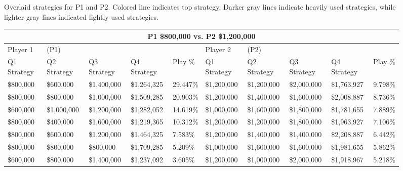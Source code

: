 \documentclass[11pt]{article}
\begin{document}
\begin{figure}
{
}
\caption{Overlaid strategies for P1 and P2. Colored line indicates top strategy. Darker gray lines indicate heavily used strategies, while lighter gray lines indicated lightly used strategies.}
\label{8v11.4}
\end{figure}

\begin{figure}
\tiny
\begin{tabular}{ |p{1.0cm}p{1.0cm}p{1.0cm}p{2.0cm}|p{1.0cm}||p{1.0cm}p{1.0cm}p{1.0cm}p{2.0cm}|p{1.0cm}|}
\hline
\multicolumn{10}{|c|}{P1 \$800,000 vs. P2 \$1,200,000} \\
\hline
Player 1 & (P1) & & & & Player 2 & (P2) & & & \\
\hline
Q1 Strategy & Q2 Strategy & Q3 Strategy & Q4 Strategy  &  Play \% & Q1 Strategy & Q2 Strategy & Q3 Strategy & Q4 Strategy  &  Play \%\\
\hline
\$800,000 & \$600,000 & \$1,400,000 & \$1,264,325 & 29.447\% & \$1,200,000 & \$1,200,000 & \$2,000,000 & \$1,763,927 & 9.798\% \\
\$800,000 & \$800,000 & \$1,000,000 & \$1,509,285 & 20.903\% & \$1,200,000 & \$1,400,000 & \$1,600,000 & \$2,008,887 & 8.736\% \\
\$600,000 & \$1,000,000 & \$1,200,000 & \$1,282,052 & 14.619\% & \$1,000,000 & \$1,600,000 & \$1,800,000 & \$1,781,655 & 7.889\% \\
\$800,000 & \$400,000 & \$1,600,000 & \$1,219,365 & 10.312\% & \$1,200,000 & \$1,200,000 & \$1,800,000 & \$1,963,927 & 7.106\% \\
\$800,000 & \$600,000 & \$1,200,000 & \$1,464,325 & 7.583\% & \$1,200,000 & \$1,400,000 & \$1,400,000 & \$2,208,887 & 6.442\% \\
\$800,000 & \$800,000 & \$800,000 & \$1,709,285 & 5.209\% & \$1,000,000 & \$1,600,000 & \$1,600,000 & \$1,981,655 & 5.862\% \\
\$600,000 & \$800,000 & \$1,400,000 & \$1,237,092 & 3.605\% & \$1,200,000 & \$1,000,000 & \$2,000,000 & \$1,918,967 & 5.218\% \\

\end{tabular}
\end{figure}
\end{document}
